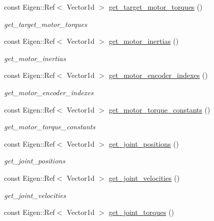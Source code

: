 \begin{DoxyCompactItemize}
const Eigen\+::\+Ref$<$ Vector1d $>$ \hyperlink{classblmc__robots_1_1SingleMotor_a5fe1f45ebb4893b1b31e1f0f23fb48e2}{get\+\_\+target\+\_\+motor\+\_\+torques} ()
\begin{DoxyCompactList}\small\item\em get\+\_\+target\+\_\+motor\+\_\+torques \end{DoxyCompactList}\item 
const Eigen\+::\+Ref$<$ Vector1d $>$ \hyperlink{classblmc__robots_1_1SingleMotor_a7126966be33a93491dcf10d62f711768}{get\+\_\+motor\+\_\+inertias} ()
\begin{DoxyCompactList}\small\item\em get\+\_\+motor\+\_\+inertias \end{DoxyCompactList}\item 
const Eigen\+::\+Ref$<$ Vector1d $>$ \hyperlink{classblmc__robots_1_1SingleMotor_a1a7ff027c499ed3fc164a399e5b498e1}{get\+\_\+motor\+\_\+encoder\+\_\+indexes} ()
\begin{DoxyCompactList}\small\item\em get\+\_\+motor\+\_\+encoder\+\_\+indexes \end{DoxyCompactList}\item 
const Eigen\+::\+Ref$<$ Vector1d $>$ \hyperlink{classblmc__robots_1_1SingleMotor_ac368bb72104b1a2e076142d4002740fb}{get\+\_\+motor\+\_\+torque\+\_\+constants} ()
\begin{DoxyCompactList}\small\item\em get\+\_\+motor\+\_\+torque\+\_\+constants \end{DoxyCompactList}\item 
const Eigen\+::\+Ref$<$ Vector1d $>$ \hyperlink{classblmc__robots_1_1SingleMotor_a4d458d18608fbca78baf6331d27a431b}{get\+\_\+joint\+\_\+positions} ()
\begin{DoxyCompactList}\small\item\em get\+\_\+joint\+\_\+positions \end{DoxyCompactList}\item 
const Eigen\+::\+Ref$<$ Vector1d $>$ \hyperlink{classblmc__robots_1_1SingleMotor_a9a2997aaadecda0b30530d8d5afeaddf}{get\+\_\+joint\+\_\+velocities} ()
\begin{DoxyCompactList}\small\item\em get\+\_\+joint\+\_\+velocities \end{DoxyCompactList}\item 
const Eigen\+::\+Ref$<$ Vector1d $>$ \hyperlink{classblmc__robots_1_1SingleMotor_a7ac6ae993e59e6f2ea5f83a643184a9e}{get\+\_\+joint\+\_\+torques} ()

\end{DoxyCompactItemize}
